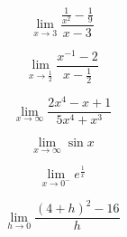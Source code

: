 \documentclass{exam}
\begin{document}
\begin{enumerate}
\newpage


\begin{minipage}{.5\linewidth}
\begin{equation*}
 \lim_{x\to 3} \frac{\frac{1}{x^{2}}-\frac{1}{9}}{x-3}
\end{equation*}
\end{minipage}%
\begin{minipage}{.5\linewidth}
\begin{equation*}
\lim_{x\to \frac{1}{2}} \frac{x^{-1}-2}{x-\frac{1}{2}}
\end{equation*}
\end{minipage}
\vfill





\begin{minipage}{.5\linewidth}
\begin{equation*}
 \lim_{x\to \infty} \frac{2x^{4}-x+1}{5x^{4}+x^3}
\end{equation*}
\end{minipage}%
\begin{minipage}{.5\linewidth}
\begin{equation*}
\lim_{x\to \infty} \sin{x}
\end{equation*}
\end{minipage}
\vfill



\begin{minipage}{.5\linewidth}
\begin{equation*}
 \lim_{x\to 0^{-}} e^{\frac{1}{x}}
\end{equation*}
\end{minipage}%
\begin{minipage}{.5\linewidth}
\begin{equation*}
 \lim_{h\to 0} \frac{(4+h)^{2}-16}{h} 
\end{equation*}
\end{minipage}
\vfill








\newpage


\end{enumerate}
\end{document}
